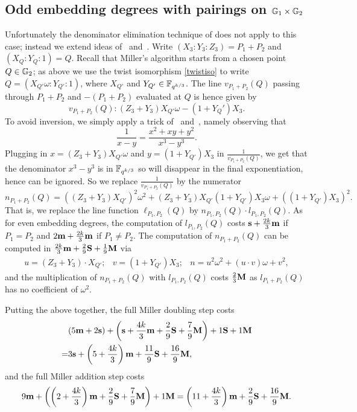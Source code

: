 \subsection{Odd embedding degrees with pairings on $\mathbb{G}_{1} \times \mathbb{G}_{2}$}

Unfortunately the denominator elimination technique of \cite{2010/Gu} does not apply to this case;
instead we extend ideas of~\cite{2008/lin} and~\cite{2009/deg15}.
Write $(X_3:Y_3:Z_3) = P_1 + P_2$ and $(X_Q:Y_Q:1) = Q$. 
Recall that Miller's algorithm starts from a chosen point $Q \in \mathbb{G}_{2}$;
as above we use the twist isomorphism \eqref{twistiso} to write
$Q = (X_{Q'}\omega:Y_{Q'}:1)$, where $X_{Q'}$ and $Y_{Q'} \in \mathbb{F}_{q^{k/3}}$.
The line $v_{P_1+P_2}(Q)$ passing through $P_1+P_2$ and $-(P_1 + P_2)$ 
evaluated at $Q$
is hence given by
\[v_{P_1+P_2}(Q): 
(Z_3 + Y_3)X_{Q'}\omega - (1+Y_Q')X_3.\]
To avoid inversion, we simply apply a trick of~\cite{2008/lin} and~\cite{2009/deg15}, 
namely observing that
\[\frac{1}{x-y} = \frac{x^2 + xy + y^2}{x^3-y^3}.\]
Plugging in $x = (Z_3 + Y_3)X_{Q'}\omega$ and $y = (1+Y_{Q'})X_3$ in $\frac{1}{v_{P_1+P_2}(Q)}$,
we get that the denominator $x^3 - y^3$ is in $\mathbb{F}_{q^{k/3}}$ so will disappear in the final exponentiation, hence can be ignored.
So we replace $\frac{1}{v_{P_1+P_2}(Q)}$ by the numerator 
$$n_{P_1+P_2}(Q) = ((Z_3 + Y_3)X_{Q'})^2\omega^2 
+ (Z_3 + Y_3)X_{Q'}(1+Y_{Q'})X_3\omega 
+ ((1+Y_{Q'})X_3)^2.$$
That is, we replace the line function $\ell_{P_1,P_2}(Q)$ by $n_{P_1,P_2}(Q) \cdot l_{P_1,P_2}(Q)$.
As for even embedding degrees, the computation of $l_{P_1,P_2}(Q)$ costs $\textbf{s} + \frac{2k}{3}\textbf{m}$ if $P_1 = P_2$ and $2\textbf{m} + \frac{2k}{3}\textbf{m}$ if $P_1 \neq P_2$. 
The computation of $n_{P_1+P_2}(Q)$ can be computed in
$\frac{2k}{3}\textbf{m} + \frac{2}{9}\textbf{S} + \frac{1}{9}\textbf{M}$ via
\[\begin{array}{cccc}
u = (Z_3 + Y_3)\cdot X_{Q'}; &
v = (1+Y_{Q'})X_3; &
n = u^2\omega^2 + (u\cdot v)\omega + v^2,
\end{array}\]
and the multiplication of $n_{P_1+P_2}(Q)$ with $l_{P_1,P_2}(Q)$ costs $\frac{2}{3}\textbf{M}$ 
as $l_{P_1+P_2}(Q)$ has no coefficient of $\omega^2$.

Putting the above together, the full Miller doubling step costs
\begin{align*}
&(5\textbf{m} + 2\textbf{s}) + \left(\textbf{s} + \frac{4k}{3}\textbf{m} + \frac{2}{9}\textbf{S} + \frac{7}{9}\textbf{M}\right)  + 1\textbf{S} + 1\textbf{M} \\
=&3\textbf{s} + \left(5 + \frac{4k}{3}\right)\textbf{m} + \frac{11}{9}\textbf{S} + \frac{16}{9}\textbf{M},
\end{align*}
and the full Miller addition step costs 
\[9\textbf{m} + \left( \left(2+\frac{4k}{3}\right)\textbf{m} + \frac{2}{9}\textbf{S} + \frac{7}{9}\textbf{M}\right) + 1\textbf{M}
=\left( 11+\frac{4k}{3}\right)\textbf{m} + \frac{2}{9}\textbf{S} + \frac{16}{9}\textbf{M}.\]

